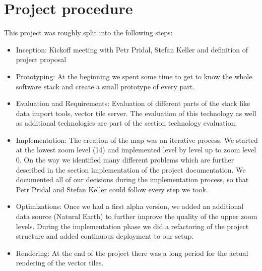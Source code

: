 
\section{Project procedure}

This project was roughly split into the following steps:

\begin{itemize}
\item
  Inception: Kickoff meeting with Petr Pridal, Stefan Keller and
  definition of project proposal
\item
  Prototyping: At the beginning we spent some time to get to know the
  whole software stack and create a small prototype of every part.
\item
  Evaluation and Requirements: Evaluation of different parts of the
  stack like data import tools, vector tile server. The evaluation of
  this technology as well as additional technologies are part of the
  section technology evaluation.
\item
  Implementation: The creation of the map was an iterative process. We
  started at the lowest zoom level (14) and implemented level by level up
  to zoom level 0. On the way we identified many different problems
  which are further described in the section implementation of the
  project documentation. We documented all of our decisions during the
  implementation process, so that Petr Pridal and Stefan Keller could
  follow every step we took.
\item
  Optimizations: Once we had a first alpha version, we added an
  additional data source (Natural Earth) to further improve the quality
  of the upper zoom levels. During the implementation phase we did a
  refactoring of the project structure and added continuous deployment
  to our setup.
\item
  Rendering: At the end of the project there was a long period for the
  actual rendering of the vector tiles.
\end{itemize}
\newpage